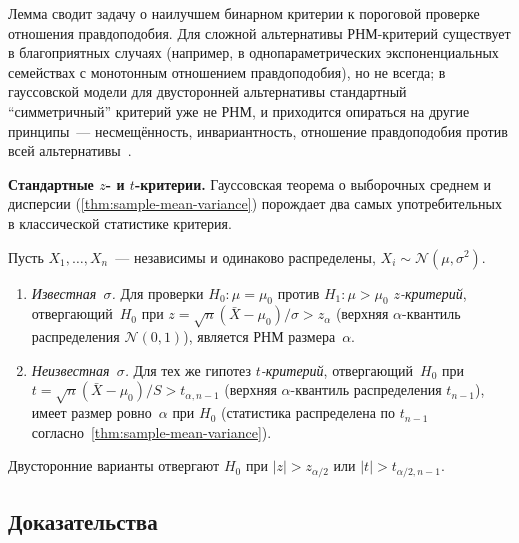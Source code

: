 \begin{remark}
Лемма сводит задачу о наилучшем бинарном критерии к пороговой проверке отношения правдоподобия. Для сложной альтернативы РНМ-критерий существует в благоприятных случаях (например, в одно\-па\-ра\-мет\-ри\-чес\-ких экспоненциальных семействах с монотонным отношением правдоподобия), но не всегда; в гауссовской модели для двусторонней альтернативы стандартный ``симметричный'' критерий уже не РНМ, и приходится опираться на другие принципы~--- несмещённость, инвариантность, отношение правдоподобия против всей альтернативы~\cite[гл.~VII]{Shiryaev1989}.
\end{remark}

\medskip
\noindent\textbf{Стандартные $z$- и $t$-критерии.} Гауссовская теорема о выборочных среднем и дисперсии (\cref{thm:sample-mean-variance}) порождает два самых употребительных в классической статистике критерия.

\begin{proposition}
\label{prop:z-and-t-tests}
Пусть $X_1, \dots, X_n$~--- независимы и одинаково распределены, $X_i \sim \mathcal{N}(\mu, \sigma^2)$.
\begin{enumerate}[label=(\alph*)]
  \item \emph{Известная~$\sigma$.} Для проверки $H_0 : \mu = \mu_0$ против $H_1 : \mu > \mu_0$ \emph{$z$-критерий}, отвергающий~$H_0$ при $z = \sqrt n (\bar X - \mu_0)/\sigma > z_\alpha$ (верхняя $\alpha$-квантиль распределения $\mathcal{N}(0, 1)$), является РНМ размера~$\alpha$.
  \item \emph{Неизвестная~$\sigma$.} Для тех же гипотез \emph{$t$-критерий}, отвергающий~$H_0$ при $t = \sqrt n (\bar X - \mu_0)/S > t_{\alpha, n - 1}$ (верхняя $\alpha$-квантиль распределения $t_{n - 1}$), имеет размер ровно~$\alpha$ при $H_0$ (статистика распределена по $t_{n - 1}$ согласно~\cref{thm:sample-mean-variance}).
\end{enumerate}
Двусторонние варианты отвергают $H_0$ при $|z| > z_{\alpha/2}$ или $|t| > t_{\alpha/2, n - 1}$.
\end{proposition}

\subsection*{Доказательства}

